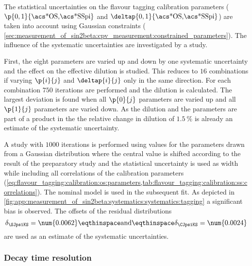 The statistical uncertainties on the flavour tagging calibration parameters
($\p{0,1}{\text{\acs*{OS},\acs*{SSpi}}}$ and
$\deltap{0,1}{\text{\acs*{OS},\acs*{SSpi}}}$) are taken into account using
Gaussian constraints (\cf
\cref{sec:measurement_of_sin2beta:cpv_measurement:constrained_parameters}). The
influence of the systematic uncertainties are investigated by a \ToyMC study.

First, the eight parameters are varied up and down by one systematic uncertainty
and the effect on the effective dilution is studied. This reduces to $16$
combinations if varying $\p{i}{j}$ and $\deltap{i}{j}$ only in the same
direction. For each combination $\num{750}$ iterations are performed and the
dilution is calculated. The largest deviation is found when all $\p{0}{j}$
parameters are varied up and all $\p{1}{j}$ parameters are varied down. As the
dilution and the \CP parameters are part of a product in the \PDF the relative
change in dilution of $\SI{1.5}{\percent}$ is already an estimate of the
systematic uncertainty.

A \ToyMC study with $\num{1000}$ iterations is performed using values for the
\CP parameters drawn from a Gaussian distribution where the central value is
shifted according to the result of the preparatory study and the statistical
uncertainty is used as width while including all correlations of the calibration
parameters 
(\cf \cref{eq:flavour_tagging:calibration:os:parameters,tab:flavour_tagging:calibration:ss:correlations}).
The nominal model is used in the subsequent fit. As depicted in 
\cref{fig:app:measurement_of_sin2beta:systematics:systematics:tagging} a
significant bias is observed. The offsets of the residual distributions
%
\begin{equation}
  \delta_{\SJpsiKS} = \num{0.0062}\eqthinspace\text{and}\eqthinspace\delta_{\CJpsiKS} = \num{0.0024}
\end{equation}
%
are used as an estimate of the systematic uncertainties.

\subsubsection{Decay time resolution}
\label{sec:measurement_of_sin2beta:systematics:systematics:resolution}

